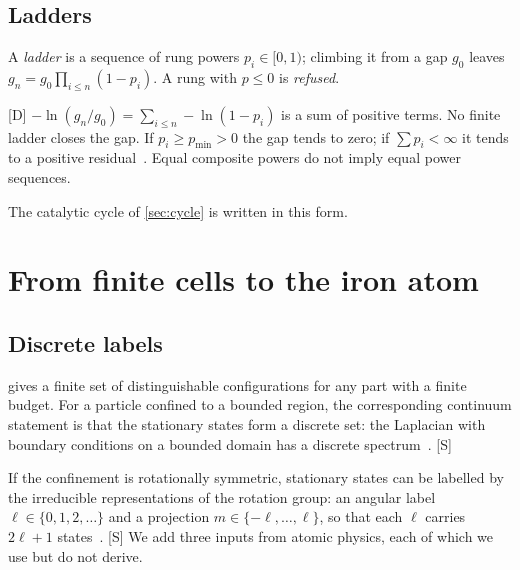 \documentclass[10pt,twocolumn,a4paper]{article}
\newcommand{\D}{\textsf{[D]}}
\newcommand{\Sup}{\textsf{[S]}}
\begin{document}
\subsection{Ladders}

\begin{definition}[Ladder]
\label{def:ladder}
A \emph{ladder} is a sequence of rung powers $p_i\in[0,1)$; climbing it from a
gap $g_0$ leaves $g_n=g_0\prod_{i\le n}(1-p_i)$. A rung with $p\le0$ is
\emph{refused}.
\end{definition}

\begin{proposition}
\label{prop:ladder}
\D{} $-\ln(g_n/g_0)=\sum_{i\le n}-\ln(1-p_i)$ is a sum of positive terms. No
finite ladder closes the gap. If $p_i\ge p_{\min}>0$ the gap tends to zero; if
$\sum p_i<\infty$ it tends to a positive residual~\citep{knopp1990}. Equal
composite powers do not imply equal power sequences.
\end{proposition}

The catalytic cycle of \cref{sec:cycle} is written in this form.

\section{From finite cells to the iron atom}
\label{sec:atoms}

\subsection{Discrete labels}

 gives a finite set of distinguishable configurations for
any part with a finite budget. For a particle confined to a bounded region,
the corresponding continuum statement is that the stationary states form a
discrete set: the Laplacian with boundary conditions on a bounded domain has
a discrete spectrum~\citep{courant1953}. \Sup

If the confinement is rotationally symmetric, stationary states can be
labelled by the irreducible representations of the rotation group: an angular
label $\ell\in\{0,1,2,\dots\}$ and a projection $m\in\{-\ell,\dots,\ell\}$,
so that each $\ell$ carries $2\ell+1$ states~\citep{courant1953}. \Sup{} We
add three inputs from atomic physics, each of which we use but do not derive.
\end{document}

